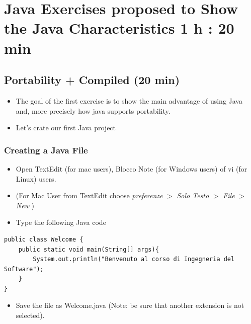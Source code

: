 \documentclass{article}
\theoremstyle{definition}
\begin{document}
\section{Java Exercises proposed to Show the Java Characteristics 1 h : 20 min}
\subsection{Portability + Compiled (20 min)}
\begin{itemize}
\item The goal of the first exercise is to show the main advantage of using Java and, more precisely how java supports portability.
\item Let's crate our first Java project
\end{itemize}

\subsubsection{Creating a Java File}
\begin{itemize}
\item Open TextEdit (for mac users), Blocco Note (for Windows users) of vi (for Linux) users.
\item (For Mac User from TextEdit choose \textit{preferenze} $>$ \textit{Solo Testo} $>$ \textit{File} $>$ \textit{New} )
\item Type the following Java code
\end{itemize}
\begin{lstlisting}
public class Welcome {	
    public static void main(String[] args){	
	 	System.out.println("Benvenuto al corso di Ingegneria del Software");
    }
}
\end{lstlisting}
\begin{itemize}
\item Save the file as Welcome.java (Note: be sure that another extension is not selected).
\end{itemize}
\end{document}
